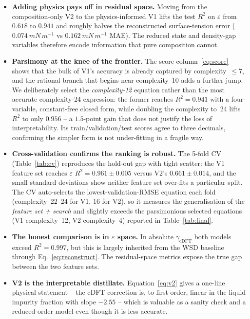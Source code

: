 \documentclass[11pt]{article}
\newcommand{\eps}{\varepsilon}
\newcommand{\gcDFT}{\gamma_{\mathrm{cDFT}}}
\begin{document}
\begin{itemize}
\item \textbf{Adding physics pays off in residual space.} Moving from the
composition-only V2 to the physics-informed V1 lifts the test $R^2$ on
$\eps$ from $0.618$ to $0.941$ and roughly halves the reconstructed
surface-tension error ($\SI{0.074}{mN\,m^{-1}}$ vs $\SI{0.162}{mN\,m^{-1}}$
MAE). The reduced state and density-gap variables therefore encode
information that pure composition cannot.

\item \textbf{Parsimony at the knee of the frontier.} The score
column~\eqref{eq:score} shows that the bulk of V1's accuracy is already
captured by complexity~$\le 7$, and the rational branch that begins near
complexity~10 adds a further jump. We deliberately select the
\emph{complexity-12} equation rather than the most accurate complexity-24
expression: the former reaches $R^2=0.941$ with a four-variable,
constant-free closed form, while doubling the complexity to~24 lifts $R^2$ to
only $0.956$ -- a $1.5$-point gain that does not justify the loss of
interpretability. Its train/validation/test scores agree to three decimals,
confirming the simpler form is not under-fitting in a fragile way.

\item \textbf{Cross-validation confirms the ranking is robust.} The 5-fold
CV (Table~\ref{tab:cv}) reproduces the hold-out gap with tight scatter:
the V1 feature set reaches $\eps$ $R^2=0.961\pm0.005$ versus V2's
$0.661\pm0.014$, and the small standard deviations show neither feature set
over-fits a particular split. The CV auto-selects the lowest-validation-RMSE
equation each fold (complexity~22--24 for V1, 16 for V2), so it measures the
generalisation of the \emph{feature set + search} and slightly exceeds the
parsimonious selected equations (V1 complexity~12, V2 complexity~4) reported
in Table~\ref{tab:final}.

\item \textbf{The honest comparison is in $\eps$ space.} In absolute
$\gcDFT$ both models exceed $R^2=0.997$, but this is largely inherited from
the WSD baseline through Eq.~\eqref{eq:reconstruct}. The residual-space
metrics expose the true gap between the two feature sets.

\item \textbf{V2 is the interpretable distillate.} Equation~\eqref{eq:v2}
gives a one-line physical statement -- the cDFT correction is, to first
order, linear in the liquid impurity fraction with slope $-2.55$ -- which is
valuable as a sanity check and a reduced-order model even though it is less
accurate.
\end{itemize}
\end{document}
